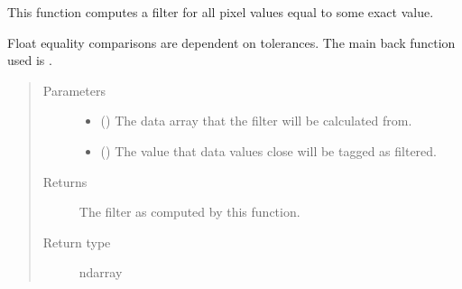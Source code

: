 \documentclass[letterpaper,10pt,english]{sphinxmanual}
\begin{document}
\begin{fulllineitems}
\label{\detokenize{docstrings/ifa_smeargle.masking.filters:ifa_smeargle.masking.filters.filter_exact_value}}
This function computes a filter for all pixel values
equal to some exact value.

Float equality comparisons are dependent on tolerances. The main
back function used is .
\begin{quote}\begin{description}
\item[{Parameters}] \leavevmode\begin{itemize}
\item {} 
 () \textendash{} The data array that the filter will be calculated from.

\item {} 
 () \textendash{} The value that data values close will be tagged as filtered.

\end{itemize}

\item[{Returns}] \leavevmode
{} \textendash{} The filter as computed by this function.

\item[{Return type}] \leavevmode
ndarray

\end{description}\end{quote}

\end{fulllineitems}

\end{document}

